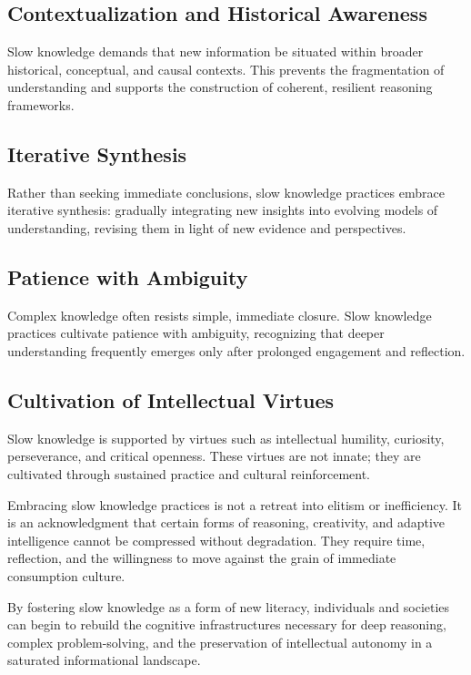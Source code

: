 \subsection{Contextualization and Historical Awareness}

Slow knowledge demands that new information be situated within broader
historical, conceptual, and causal contexts. This prevents the
fragmentation of understanding and supports the construction of
coherent, resilient reasoning frameworks.

\subsection{Iterative Synthesis}

Rather than seeking immediate conclusions, slow knowledge practices
embrace iterative synthesis: gradually integrating new insights into
evolving models of understanding, revising them in light of new evidence
and perspectives.

\subsection{Patience with Ambiguity}

Complex knowledge often resists simple, immediate closure. Slow
knowledge practices cultivate patience with ambiguity, recognizing that
deeper understanding frequently emerges only after prolonged engagement
and reflection.

\subsection{Cultivation of Intellectual Virtues}

Slow knowledge is supported by virtues such as intellectual humility,
curiosity, perseverance, and critical openness. These virtues are not
innate; they are cultivated through sustained practice and cultural
reinforcement.

Embracing slow knowledge practices is not a retreat into elitism or
inefficiency. It is an acknowledgment that certain forms of reasoning,
creativity, and adaptive intelligence cannot be compressed without
degradation. They require time, reflection, and the willingness to move
against the grain of immediate consumption culture.

By fostering slow knowledge as a form of new literacy, individuals and
societies can begin to rebuild the cognitive infrastructures necessary
for deep reasoning, complex problem-solving, and the preservation of
intellectual autonomy in a saturated informational landscape.



